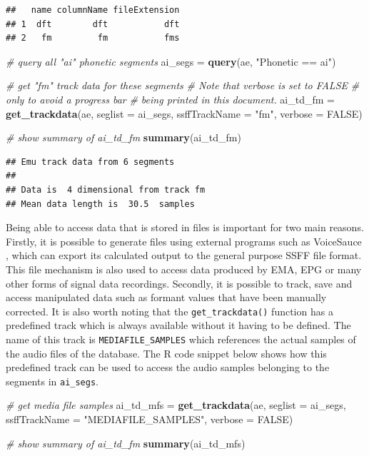 \documentclass[]{book}
\newenvironment{Shaded}{\begin{snugshade}}{\end{snugshade}}
\newcommand{\CommentTok}[1]{\textcolor[rgb]{0.56,0.35,0.01}{\textit{#1}}}
\newcommand{\DataTypeTok}[1]{\textcolor[rgb]{0.13,0.29,0.53}{#1}}
\newcommand{\KeywordTok}[1]{\textcolor[rgb]{0.13,0.29,0.53}{\textbf{#1}}}
\newcommand{\NormalTok}[1]{#1}
\newcommand{\OtherTok}[1]{\textcolor[rgb]{0.56,0.35,0.01}{#1}}
\newcommand{\StringTok}[1]{\textcolor[rgb]{0.31,0.60,0.02}{#1}}
\begin{document}
\begin{verbatim}
##   name columnName fileExtension
## 1  dft        dft           dft
## 2   fm         fm           fms
\end{verbatim}

\begin{Shaded}
\begin{Highlighting}[]
\CommentTok{# query all "ai" phonetic segments}
\NormalTok{ai_segs =}\StringTok{ }\KeywordTok{query}\NormalTok{(ae, }\StringTok{"Phonetic == ai"}\NormalTok{)}

\CommentTok{# get "fm" track data for these segments}
\CommentTok{# Note that verbose is set to FALSE}
\CommentTok{# only to avoid a progress bar}
\CommentTok{# being printed in this document.}
\NormalTok{ai_td_fm =}\StringTok{ }\KeywordTok{get_trackdata}\NormalTok{(ae,}
                      \DataTypeTok{seglist =}\NormalTok{ ai_segs,}
                      \DataTypeTok{ssffTrackName =} \StringTok{"fm"}\NormalTok{,}
                      \DataTypeTok{verbose =} \OtherTok{FALSE}\NormalTok{)}

\CommentTok{# show summary of ai_td_fm}
\KeywordTok{summary}\NormalTok{(ai_td_fm)}
\end{Highlighting}
\end{Shaded}

\begin{verbatim}
## Emu track data from 6 segments
## 
## Data is  4 dimensional from track fm 
## Mean data length is  30.5  samples
\end{verbatim}

Being able to access data that is stored in files is important for two main reasons. Firstly, it is possible to generate files using external programs such as VoiceSauce \citep{shue:2011a}, which can export its calculated output to the general purpose SSFF file format. This file mechanism is also used to access data produced by EMA, EPG or many other forms of signal data recordings. Secondly, it is possible to track, save and access manipulated data such as formant values that have been manually corrected. It is also worth noting that the \texttt{get\_trackdata()} function has a predefined track which is always available without it having to be defined. The name of this track is \texttt{MEDIAFILE\_SAMPLES} which references the actual samples of the audio files of the database. The R code snippet below shows how this predefined track can be used to access the audio samples belonging to the segments in \texttt{ai\_segs}.

\begin{Shaded}
\begin{Highlighting}[]
\CommentTok{# get media file samples}
\NormalTok{ai_td_mfs =}\StringTok{ }\KeywordTok{get_trackdata}\NormalTok{(ae,}
                          \DataTypeTok{seglist =}\NormalTok{ ai_segs,}
                          \DataTypeTok{ssffTrackName =} \StringTok{"MEDIAFILE_SAMPLES"}\NormalTok{,}
                          \DataTypeTok{verbose =} \OtherTok{FALSE}\NormalTok{)}

\CommentTok{# show summary of ai_td_fm}
\KeywordTok{summary}\NormalTok{(ai_td_mfs)}
\end{Highlighting}
\end{Shaded}
\end{document}
